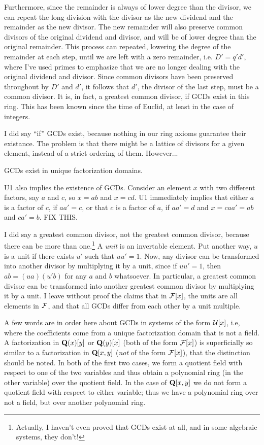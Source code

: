 Furthermore, since the remainder is always of lower degree than the
divisor, we can repeat the long division with the divisor as the new
dividend and the remainder as the new divisor.  The new remainder will
also preserve common divisors of the original dividend and divisor,
and will be of lower degree than the original remainder.  This process
can repeated, lowering the degree of the remainder at each step, until
we are left with a zero remainder, i.e. $D' = q' d'$, where I've used
primes to emphasize that we are no longer dealing with the original
dividend and divisor.  Since common divisors have been preserved
throughout by $D'$ and $d'$, it follows that $d'$, the divisor of the
last step, must be a common divisor.  It is, in fact, a greatest
common divisor, if GCDs exist in this ring.  This has been known since
the time of Euclid, at least in the case of integers.

I did say ``if'' GCDs exist, because nothing in our ring axioms
guarantee their existance.  The problem is that there might be a
lattice of divisors for a given element, instead of a strict ordering
of them.  However...

\theorem

GCDs exist in unique factorization domains.

\proof

U1 also implies the existence of GCDs.  Consider an element $x$ with
two different factors, say $a$ and $c$, so $x=ab$ and $x=cd$.  U1
immediately implies that either $a$ is a factor of $c$, if $aa'=c$,
or that $c$ is a factor of $a$, if $aa'=d$ and $x=caa'=ab$ and $ca'=b$.
FIX THIS.

\endtheorem

I did say a greatest common divisor, not the greatest common divisor,
because there can be more than one.\footnote{Actually, I haven't even
proved that GCDs exist at all, and in some algebraic systems, they
don't!}  A {\it unit} is an invertable element.  Put another way, $u$
is a unit if there exists $u'$ such that $uu'=1$.  Now, any divisor
can be transformed into another divisor by multiplying it by a unit,
since if $uu'=1$, then $ab=(ua)(u'b)$ for any $a$ and $b$ whatsoever.
In particular, a greatest common divisor can be transformed into
another greatest common divisor by multiplying it by a unit.  I leave
without proof the claims that in ${\cal F}[x]$, the units are all
elements in ${\cal F}$, and that all GCDs differ from each other by a
unit multiple.

A few words are in order here about GCDs in systems of the form ${\cal
U}[x]$, i.e, where the coefficients come from a unique factorization
domain that is not a field.  A factorization in ${\bf Q}(x)[y]$ or
${\bf Q}(y)[x]$ (both of the form ${\cal F}[x]$) is superficially so
similar to a factorization in ${\bf Q}[x,y]$ ({\it not} of the form
${\cal F}[x]$), that the distinction should be noted.  In both of the
first two cases, we form a quotient field with respect to one of the
two variables and thus obtain a polynomial ring (in the other
variable) over the quotient field.  In the case of ${\bf Q}[x,y]$ we
do not form a quotient field with respect to either variable; thus we
have a polynomial ring over not a field, but over another polynomial ring.

